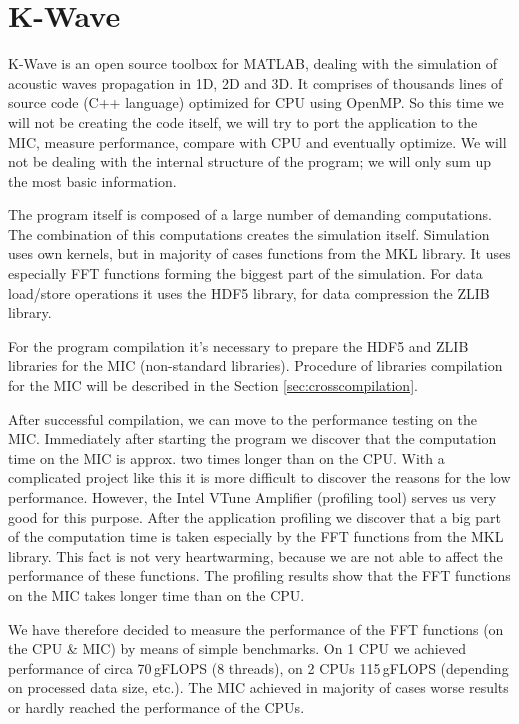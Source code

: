 \section{K-Wave}
K-Wave is an open source toolbox for MATLAB, dealing with the simulation of acoustic waves propagation in 1D, 2D and 3D. It comprises of thousands lines of source code (C++ language) optimized for CPU using OpenMP. So this time we will not be creating the code itself, we will try to port the application to the MIC, measure performance, compare with CPU and eventually optimize. We will not be dealing with the internal structure of the program; we will only sum up the most basic information.

\par The program itself is composed of a large number of demanding computations. The combination of this computations creates the simulation itself. Simulation uses own kernels, but in majority of cases functions from the MKL library. It uses especially FFT functions forming the biggest part of the simulation. For data load/store operations it uses the HDF5 library, for data compression the ZLIB library.

\par For the program compilation it's necessary to prepare the HDF5 and ZLIB libraries for the MIC (non-standard libraries). Procedure of libraries compilation for the MIC will be described in the Section \ref{sec:crosscompilation}.

\par After successful compilation, we can move to the performance testing on the MIC. Immediately after starting the program we discover that the computation time on the MIC is approx. two times longer than on the CPU. With a complicated project like this it is more difficult to discover the reasons for the low performance. However, the Intel VTune Amplifier (profiling tool) serves us very good for this purpose. After the application profiling we discover that a big part of the computation time is taken especially by the FFT functions from the MKL library. This fact is not very heartwarming, because we are not able to affect the performance of these functions. The profiling results show that the FFT functions on the MIC takes longer time than on the CPU.

\par We have therefore decided to measure the performance of the FFT functions (on the CPU \& MIC) by means of simple benchmarks. On 1 CPU we achieved performance of circa 70\,gFLOPS (8 threads), on 2 CPUs 115\,gFLOPS (depending on processed data size, etc.). The MIC achieved in majority of cases worse results or hardly reached the performance of the CPUs.

